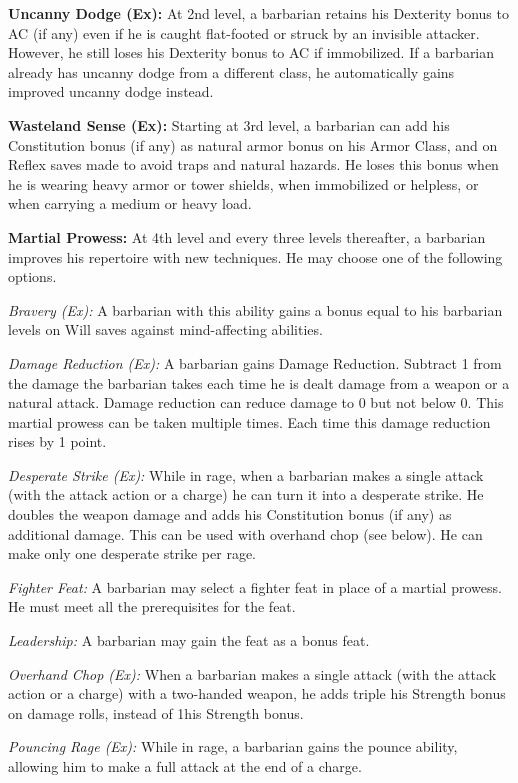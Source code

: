 \textbf{Uncanny Dodge (Ex):} At 2nd level, a barbarian retains his Dexterity bonus to AC (if any) even if he is caught flat-footed or struck by an invisible attacker. However, he still loses his Dexterity bonus to AC if immobilized. If a barbarian already has uncanny dodge from a different class, he automatically gains improved uncanny dodge instead.

\textbf{Wasteland Sense (Ex):} Starting at 3rd level, a barbarian can add his Constitution bonus (if any) as natural armor bonus on his Armor Class, and on Reflex saves made to avoid traps and natural hazards. He loses this bonus when he is wearing heavy armor or tower shields, when immobilized or helpless, or when carrying a medium or heavy load.

\textbf{Martial Prowess:} At 4th level and every three levels thereafter, a barbarian improves his repertoire with new techniques. He may choose one of the following options.

\textit{Bravery (Ex):} A barbarian with this ability gains a bonus equal to \onehalf his barbarian levels on Will saves against mind-affecting abilities.

\textit{Damage Reduction (Ex):} A barbarian gains Damage Reduction. Subtract 1 from the damage the barbarian takes each time he is dealt damage from a weapon or a natural attack. Damage reduction can reduce damage to 0 but not below 0. This martial prowess can be taken multiple times. Each time this damage reduction rises by 1 point.

\textit{Desperate Strike (Ex):} While in rage, when a barbarian makes a single attack (with the attack action or a charge) he can turn it into a desperate strike. He doubles the weapon damage and adds his Constitution bonus (if any) as additional damage. This can be used with overhand chop (see below). He can make only one desperate strike per rage.

\textit{Fighter Feat:} A barbarian may select a fighter feat in place of a martial prowess. He must meet all the prerequisites for the feat.

\textit{Leadership:} A barbarian may gain the  feat as a bonus feat.

\textit{Overhand Chop (Ex):} When a barbarian makes a single attack (with the attack action or a charge) with a two-handed weapon, he adds triple his Strength bonus on damage rolls, instead of 1\onehalf his Strength bonus.

\textit{Pouncing Rage (Ex):} While in rage, a barbarian gains the pounce ability, allowing him to make a full attack at the end of a charge.

